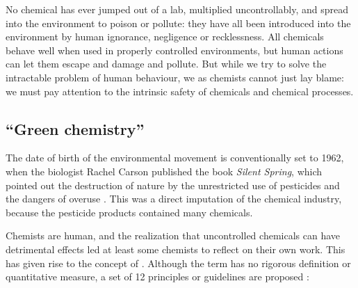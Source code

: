 No chemical has ever jumped out of a lab, multiplied uncontrollably, and spread
into the environment to poison or pollute: they have all been introduced into
the environment by human ignorance, negligence or recklessness. All chemicals
behave well when used in properly controlled environments, but human actions can
let them escape and damage and pollute. But while we try to solve the
intractable problem of human behaviour, we as chemists cannot just lay blame: we
must pay attention to the intrinsic safety of chemicals and chemical processes.
 
\subsection{``Green chemistry''}
\label{sec:GreenChemistry}
The date of birth of the environmental movement is conventionally set to 1962, when
the biologist Rachel Carson published the book \textit{Silent Spring}, which
pointed out the destruction of nature by the unrestricted use of pesticides and
the dangers of overuse \autocite{Carson1962}. This was a direct imputation of
the chemical industry, because the pesticide products contained many chemicals.

Chemists are human, and the realization that uncontrolled chemicals can have
detrimental effects led at least some chemists to reflect on their own work.
This has given rise to the concept of . Although the
term has no rigorous definition or quantitative measure\autocite{Linthorst2010},
a set of 12 principles or guidelines are proposed \autocite{Anastas1998}:

